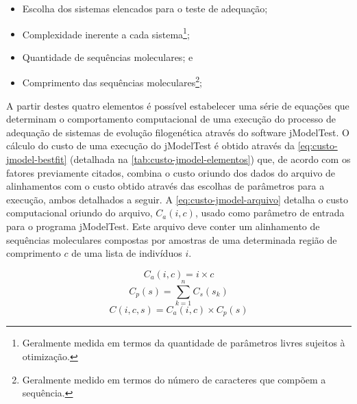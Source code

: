 \documentclass[english,brazilian]{UNISINOSmonografia} %
\begin{document}
\begin{itemize}
	\label{list:fatores-influenciam-performance}
	
	\item Escolha dos sistemas elencados para o teste de adequação;
	
	\item Complexidade inerente a cada sistema\footnote{
		Geralmente medida em termos da quantidade de parâmetros livres sujeitos à otimização.
	};
	
	\item Quantidade de sequências moleculares; e
	
	\item Comprimento das sequências moleculares\footnote{
		Geralmente medido em termos do número de caracteres que compõem a sequência.
	};
\end{itemize}


A partir destes quatro elementos é possível estabelecer uma série de equações que determinam o comportamento computacional de uma execução do processo de adequação de sistemas de evolução filogenética através do software jModelTest.
O cálculo do custo de uma execução do jModelTest é obtido através da \autoref{eq:custo-jmodel-bestfit} (detalhada na \autoref{tab:custo-jmodel-elementos}) que, de acordo com os fatores previamente citados, combina o custo oriundo dos dados do arquivo de alinhamentos com o custo obtido através das escolhas de parâmetros para a execução, ambos detalhados a seguir.
A \autoref{eq:custo-jmodel-arquivo} detalha o custo computacional oriundo do arquivo, $ C_a(i,c) $, usado como parâmetro de entrada para o programa jModelTest. 
Este arquivo deve conter um alinhamento de sequências moleculares compostas por amostras de uma determinada região de comprimento $ c $ de uma lista de indivíduos $ i $.


\begin{equation}
\label{eq:custo-jmodel-arquivo}
C_a(i,c) = i \times c
\end{equation}
\begin{equation}
\label{eq:custo-jmodel-params}
C_p(s) = \sum_{k=1}^{n} C_s(s_k)
\end{equation}
\begin{equation}
\label{eq:custo-jmodel-bestfit}
C(i,c,s) = C_a(i,c) \times C_p(s)
\end{equation}
\end{document}
